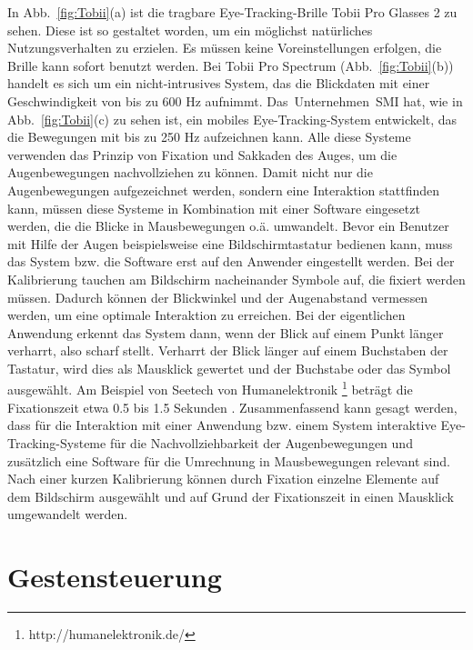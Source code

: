 In Abb.~\ref{fig:Tobii}(a) ist die tragbare Eye-Tracking-Brille Tobii Pro Glasses 2 zu sehen. Diese ist so gestaltet worden, um ein möglichst natürliches Nutzungsverhalten zu erzielen. Es müssen keine Voreinstellungen erfolgen, die Brille kann sofort benutzt werden. Bei Tobii Pro Spectrum (Abb.~\ref{fig:Tobii}(b)) handelt es sich um ein nicht-intrusives System, das die Blickdaten mit einer Geschwindigkeit von bis zu 600 Hz aufnimmt. \mbox{Das Unternehmen SMI} hat, wie in Abb.~\ref{fig:Tobii}(c) zu sehen ist, ein mobiles Eye-Tracking-System entwickelt, das die Bewegungen mit bis zu 250 Hz aufzeichnen kann. Alle diese Systeme verwenden das Prinzip von Fixation und Sakkaden des Auges, um die Augenbewegungen nachvollziehen zu können. Damit nicht nur die Augenbewegungen aufgezeichnet werden, sondern eine Interaktion stattfinden kann, müssen diese Systeme in Kombination mit einer Software eingesetzt werden, die die Blicke in Mausbewegungen o.ä. umwandelt.
\newline \newline
Bevor ein Benutzer mit Hilfe der Augen beispielsweise eine Bildschirmtastatur bedienen kann, muss das System bzw. die Software erst auf den Anwender eingestellt werden. Bei der Kalibrierung tauchen am Bildschirm nacheinander Symbole auf, die fixiert werden müssen. Dadurch können der Blickwinkel und der Augenabstand vermessen werden, um eine optimale Interaktion zu erreichen. Bei der eigentlichen Anwendung erkennt das System dann, wenn der Blick auf einem Punkt länger verharrt, also scharf stellt. Verharrt der Blick länger auf einem Buchstaben der Tastatur, wird dies als Mausklick gewertet und der Buchstabe oder das Symbol ausgewählt. Am Beispiel von Seetech von Humanelektronik%
\footnote{http://humanelektronik.de/}
%
beträgt die Fixationszeit etwa 0.5 bis 1.5 Sekunden \cite{SEETECH}.
\newline \newline
Zusammenfassend kann gesagt werden, dass für die Interaktion mit einer Anwendung bzw. einem System interaktive Eye-Tracking-Systeme für die Nachvollziehbarkeit der Augenbewegungen und zusätzlich eine Software für die Umrechnung in Mausbewegungen relevant sind. Nach einer kurzen Kalibrierung können durch Fixation einzelne Elemente auf dem Bildschirm ausgewählt und auf Grund der Fixationszeit in einen Mausklick umgewandelt werden.

\section{Gestensteuerung}

